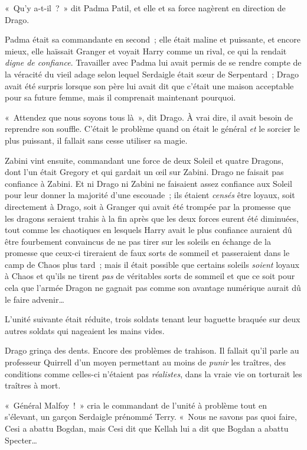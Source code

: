 «~Qu'y a-t-il~?~»
dit Padma Patil, et elle et sa force nagèrent en direction de Drago.

Padma était sa commandante en second~; elle était maline et puissante, et encore mieux, elle haïssait Granger et voyait Harry comme un rival, ce qui la rendait \emph{digne de confiance}.
Travailler avec Padma lui avait permis de se rendre compte de la véracité du vieil adage selon lequel Serdaigle était sœur de Serpentard~; Drago avait été surpris lorsque son père lui avait dit que c'était une maison acceptable pour sa future femme, mais il comprenait maintenant pourquoi.

«~Attendez que nous soyons tous là~», dit Drago.
À vrai dire, il avait besoin de reprendre son souffle.
C'était le problème quand on était le général \emph{et} le sorcier le plus puissant, il fallait sans cesse utiliser sa magie.

Zabini vint ensuite, commandant une force de deux Soleil et quatre Dragons, dont l'un était Gregory et qui gardait un œil sur Zabini.
Drago ne faisait pas confiance à Zabini.
Et ni Drago ni Zabini ne faisaient assez confiance aux Soleil pour leur donner la majorité d'une escouade~; ils étaient \emph{censés} être loyaux, soit directement à Drago, soit à Granger qui avait été trompée par la promesse que les dragons seraient trahis à la fin après que les deux forces eurent été diminuées, tout comme les chaotiques en lesquels Harry avait le plus confiance auraient dû être fourbement convaincus de ne pas tirer sur les soleils en échange de la promesse que ceux-ci tireraient de faux sorts de sommeil et passeraient dans le camp de Chaos plus tard~; mais il était possible que certains soleils \emph{soient} loyaux à Chaos et qu'ils ne tirent \emph{pas} de véritables sorts de sommeil et que ce soit pour cela que l'armée Dragon ne gagnait pas comme son avantage numérique aurait dû le faire advenir…

L'unité suivante était réduite, trois soldats tenant leur baguette braquée sur deux autres soldats qui nageaient les mains vides.

Drago grinça des dents.
Encore des problèmes de trahison.
Il fallait qu'il parle au professeur Quirrell d'un moyen permettant au moins de \emph{punir} les traîtres, des conditions comme celles-ci n'étaient pas \emph{réalistes}, dans la vraie vie on torturait les traîtres à mort.

«~Général Malfoy~!~»
cria le commandant de l'unité à problème tout en s'élevant, un garçon Serdaigle prénommé Terry.
«~Nous ne savons pas quoi faire, Cesi a abattu Bogdan, mais Cesi dit que Kellah lui a dit que Bogdan a abattu Specter…

